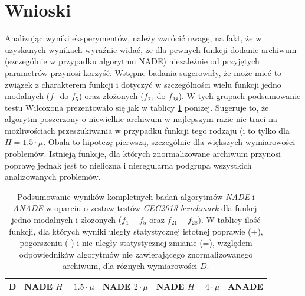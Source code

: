 \documentclass[12pt,a4paper]{report}
\begin{document}
{{{{{{\section{Wnioski}
\par{
Analizując wyniki eksperymentów, należy zwrócić uwagę, na fakt, że w uzyskanych wynikach wyraźnie widać, że dla pewnych funkcji dodanie archiwum (szczególnie w przypadku algorytmu NADE) niezależnie od przyjętych parametrów przynosi korzyść. Wstępne badania sugerowały, że może mieć to związek z charakterem funkcji i dotyczyć w szczególności wielu funkcji jedno modalnych ($f_1$ do $f_5$) oraz złożonych ($f_{21}$ do $f_{28}$). W tych grupach podsumowanie testu Wilcoxona prezentowało się jak w tablicy \ref{FULLSUMMARYUNIandCOMPLEX} poniżej. Sugeruje to, że algorytm poszerzony o niewielkie archiwum w najlepszym razie nie traci na możliwościach przeszukiwania w przypadku funkcji tego rodzaju (i to tylko dla $H = 1.5 \cdot \mu$. Obala to hipotezę pierwszą, szczególnie dla większych wymiarowości problemów. Istnieją funkcje, dla których znormalizowane archiwum przynosi poprawę jednak jest to nieliczna i nieregularna podgrupa wszystkich analizowanych problemów.
}
\begin{table}[h]
\centering
\caption{Podsumowanie wyników kompletnych badań algorytmów \emph{NADE} i \emph{ANADE} w oparciu o zestaw testów \emph{CEC2013 benchmark} dla funkcji jedno modalnych i złożonych ($f_1 - f_5$ oraz $f_{21} - f_{28}$). W tablicy ilość funkcji, dla których wyniki uległy statystycznej istotnej poprawie (+), pogorszeniu (-) i nie uległy statystycznej zmianie (=), względem odpowiedników algorytmów nie zawierającego znormalizowanego archiwum, dla różnych wymiarowości $D$.}
\label{FULLSUMMARYUNIandCOMPLEX}
\begin{tabular}{|c|c|c|c|c|c|c|c|c|c|c|c|c|}
\hline
{\bf D}  & \multicolumn{3}{c|}{{\bf NADE $H=1.5 \cdot \mu$}} & \multicolumn{3}{c|}{{\bf NADE $2 \cdot \mu$}} & \multicolumn{3}{c|}{{\bf NADE $H=4 \cdot \mu$}} & \multicolumn{3}{c|}{{\bf ANADE}} \\ \hline

\end{tabular}
\end{table}}}}}}}
\end{document}
